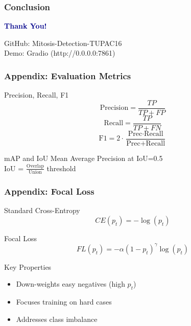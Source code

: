 \documentclass[aspectratio=169,13pt]{beamer}
\begin{document}
\begin{frame}
  \frametitle{Conclusion}
  
  \vspace{1cm}
  \centering
  \textcolor{DarkBlue}{\textbf{\Large Thank You!}}
  
  \vspace{0.5cm}
  \small
  GitHub: Mitosis-Detection-TUPAC16 \\
  Demo: Gradio (http://0.0.0.0:7861)
\end{frame}

\begin{frame}
  \frametitle{Appendix: Evaluation Metrics}
  
  \begin{block}{Precision, Recall, F1}
    $$\text{Precision} = \frac{TP}{TP + FP}$$
    $$\text{Recall} = \frac{TP}{TP + FN}$$
    $$\text{F1} = 2 \cdot \frac{\text{Prec} \cdot \text{Recall}}{\text{Prec} + \text{Recall}}$$
  \end{block}
  
  \begin{block}{mAP and IoU}
    Mean Average Precision at IoU=0.5 \\
    IoU = $\frac{\text{Overlap}}{\text{Union}}$ threshold
  \end{block}
\end{frame}

\begin{frame}
  \frametitle{Appendix: Focal Loss}
  
  \begin{block}{Standard Cross-Entropy}
    $$CE(p_t) = -\log(p_t)$$
  \end{block}
  
  \begin{block}{Focal Loss}
    $$FL(p_t) = -\alpha(1 - p_t)^{\gamma}\log(p_t)$$
  \end{block}
  
  \begin{block}{Key Properties}
    \begin{itemize}
      \item Down-weights easy negatives (high $p_t$)
      \item Focuses training on hard cases
      \item Addresses class imbalance
    \end{itemize}
  \end{block}
\end{frame}
\end{document}
